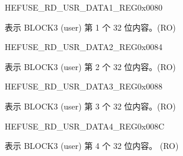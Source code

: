 \begin{register}{H}{EFUSE\_RD\_USR\_DATA1\_REG}{0x{}0080}\label{regdesc:EFUSERDUSRDATA1REG}
%
\regnewline%
\begin{regdesc}\begin{reglist}
\label{fielddesc:EFUSEUSRDATA1}\item [EFUSE\_USR\_DATA1] 表示 BLOCK3 (user) 第 1 个 32 位内容。(RO)
\end{reglist}\end{regdesc}
\end{register}


\begin{register}{H}{EFUSE\_RD\_USR\_DATA2\_REG}{0x{}0084}\label{regdesc:EFUSERDUSRDATA2REG}
%
\regnewline%
\begin{regdesc}\begin{reglist}
\label{fielddesc:EFUSEUSRDATA2}\item [EFUSE\_USR\_DATA2] 表示 BLOCK3 (user) 第 2 个 32 位内容。(RO)
\end{reglist}\end{regdesc}
\end{register}


\begin{register}{H}{EFUSE\_RD\_USR\_DATA3\_REG}{0x{}0088}\label{regdesc:EFUSERDUSRDATA3REG}
%
\regnewline%
\begin{regdesc}\begin{reglist}
\label{fielddesc:EFUSEUSRDATA3}\item [EFUSE\_USR\_DATA3] 表示 BLOCK3 (user) 第 3 个 32 位内容。(RO)
\end{reglist}\end{regdesc}
\end{register}


\begin{register}{H}{EFUSE\_RD\_USR\_DATA4\_REG}{0x{}008C}\label{regdesc:EFUSERDUSRDATA4REG}
%
\regnewline%
\begin{regdesc}\begin{reglist}
\label{fielddesc:EFUSEUSRDATA4}\item [EFUSE\_USR\_DATA4] 表示 BLOCK3 (user) 第 4 个 32 位内容。 (RO)
\end{reglist}\end{regdesc}
\end{register}



